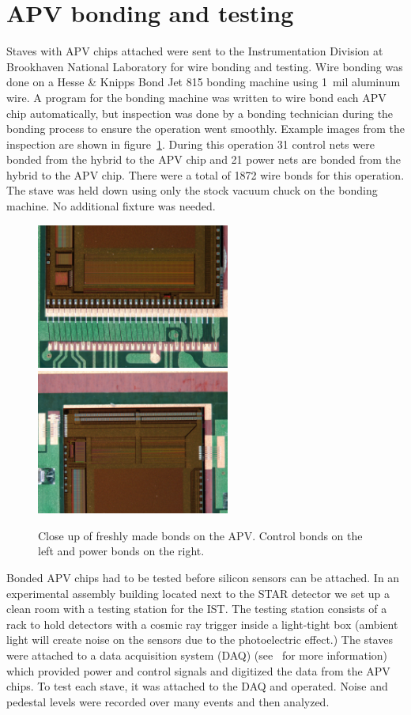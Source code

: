 \documentclass[preprint,12pt]{elsarticle}
\begin{document}
\section{APV bonding and testing}
Staves with APV chips attached were sent to the Instrumentation Division at
Brookhaven National Laboratory for wire bonding and testing. Wire bonding was
done on a Hesse \& Knipps Bond Jet 815 bonding machine using 1~mil aluminum
wire. A program for the bonding machine was written to wire bond each APV chip
automatically, but inspection was done by a bonding technician during the
bonding process to ensure the operation went smoothly.  Example images from the
inspection are shown in figure~\ref{fig:apv_bond}. During this
operation 31 control nets were bonded from the hybrid to the APV chip and 21
power nets are bonded from the hybrid to the APV chip. There were a total of 1872
wire bonds for this operation. The stave was held down using only the stock
vacuum chuck on the bonding machine. No additional fixture was needed.

\begin{figure}[h]
\begin{center}
\includegraphics[width=2.5in, keepaspectratio=true, angle=0]{graphics/control.jpg}
\includegraphics[width=2.5in, keepaspectratio=true, angle=0]{graphics/power.jpg}
\caption{Close up of freshly made bonds on the APV.  Control bonds on the left
and power bonds on the right.
\label{fig:apv_bond}}
\end{center}
\end{figure}
%
Bonded APV chips had to be tested before silicon sensors can be attached. In an
experimental assembly building located next to the STAR detector we set up a
clean room with a testing station for the IST. The testing station consists of
a rack to hold detectors with a cosmic ray trigger inside a light-tight box
(ambient light will create noise on the sensors due to the photoelectric effect.)
The staves were attached to a data acquisition system (DAQ) (see~\cite{ref:daq} for more information)
which provided power and control signals and digitized the data from the APV
chips. To test each stave, it was attached to the DAQ and operated. Noise and pedestal levels
were recorded over many events and then analyzed.
\end{document}
